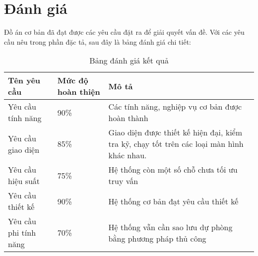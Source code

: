 	\section{Đánh giá}

Đồ án cơ bản đã đạt được các yêu cầu đặt ra để giải quyết vấn đề. Với các yêu cầu nêu trong phần đặc tả, sau đây là bảng đánh giá chi tiết:

	\begin{table}[h!]
	\begin{center}
		\caption{Bảng đánh giá kết quả}
		\begin{tabularx}{0.8\textwidth}{ |l|l|X| } 
			\hline
			Tên yêu cầu & Mức độ hoàn thiện & Mô tả\\
			\hline
			Yêu cầu tính năng & 90\% & Các tính năng, nghiệp vụ cơ bản được hoàn thành\\
			Yêu cầu giao diện & 85\% & Giao diện được thiết kế hiện đại, kiểm tra kỹ, chạy tốt trên các loại màn hình khác nhau. \\
			Yêu cầu hiệu suất & 75\% & Hệ thống còn một số chỗ chưa tối ưu truy vấn \\
			Yêu cầu thiết kế & 90\% & Hệ thống cơ bản đạt yêu cầu thiết kế \\
			Yêu cầu phi tính năng & 70\% & Hệ thống vẫn cần sao lưu dự phòng bằng phương pháp thủ công \\
			\hline
		\end{tabularx}

	\end{center}
\end{table}
